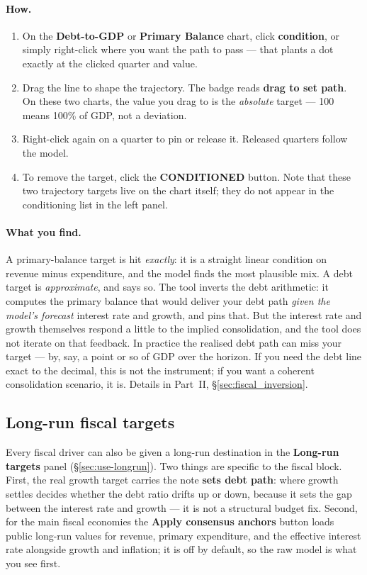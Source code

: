 \documentclass[11pt]{article}
\theoremstyle{definition}
\theoremstyle{remark}
\begin{document}
\paragraph{How.}
\begin{enumerate}
  \item On the \textbf{Debt-to-GDP} or \textbf{Primary Balance} chart, click
    \textbf{condition}, or simply right-click where you want the path to pass --- that plants a
    dot exactly at the clicked quarter and value.
  \item Drag the line to shape the trajectory. The badge reads \textbf{drag to set path}. On
    these two charts, the value you drag to is the \emph{absolute} target --- 100 means 100\%
    of GDP, not a deviation.
  \item Right-click again on a quarter to pin or release it. Released quarters follow the model.
  \item To remove the target, click the \textbf{CONDITIONED} button. Note that these two
    trajectory targets live on the chart itself; they do not appear in the conditioning list
    in the left panel.
\end{enumerate}

\paragraph{What you find.} A primary-balance target is hit \emph{exactly}: it is a straight
linear condition on revenue minus expenditure, and the model finds the most plausible mix. A
debt target is \emph{approximate}, and says so. The tool inverts the debt arithmetic: it
computes the primary balance that would deliver your debt path \emph{given the model's forecast}
interest rate and growth, and pins that. But the interest rate and growth themselves respond a
little to the implied consolidation, and the tool does not iterate on that feedback. In practice
the realised debt path can miss your target --- by, say, a point or so of GDP over the horizon.
If you need the debt line exact to the decimal, this is not the instrument; if you want
a coherent consolidation scenario, it is. Details in Part~II, \S\ref{sec:fiscal_inversion}.

\subsection{Long-run fiscal targets}

Every fiscal driver can also be given a long-run destination in the \textbf{Long-run targets}
panel (\S\ref{sec:use-longrun}). Two things are specific to the fiscal block. First, the real
growth target carries the note \textbf{sets debt path}: where growth settles decides whether
the debt ratio drifts up or down, because it sets the gap between the interest rate and growth
--- it is not a structural budget fix. Second, for the main fiscal economies the
\textbf{Apply consensus anchors} button loads public long-run values for revenue, primary
expenditure, and the effective interest rate alongside growth and inflation; it is off by
default, so the raw model is what you see first.
\end{document}
